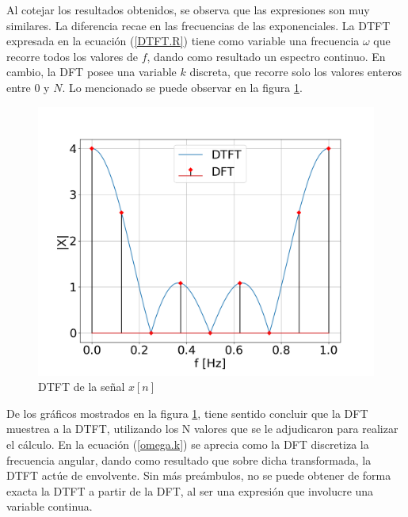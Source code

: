\documentclass[11pt,a4paper]{article}
\begin{document}
    Al cotejar los resultados obtenidos, se observa que las expresiones son muy similares. La diferencia recae en las frecuencias de las exponenciales. La DTFT expresada en la ecuación (\ref{DTFT.R}) tiene como variable una frecuencia $\omega$ que recorre todos los valores de $f$, dando como resultado un espectro continuo. En cambio, la DFT posee una variable $k$ discreta, que recorre solo los valores enteros entre 0 y $N$. Lo mencionado se puede observar en la figura \ref{fig.3a}.
    
    
    \begin{figure}[htb]
    \centering
	\includegraphics[width=.5\textwidth]{Img/punto_3_a.png}
	\caption{DTFT de la señal $x[n]$}
	\label{fig.3a}
    \end{figure}
    
    De los gráficos mostrados en la figura \ref{fig.3a}, tiene sentido concluir que la DFT muestrea a la DTFT, utilizando los N valores que se le adjudicaron para realizar el cálculo. En la ecuación (\ref{omega.k}) se aprecia como la DFT discretiza la frecuencia angular, dando como resultado que sobre dicha transformada, la DTFT actúe de envolvente. Sin más preámbulos, no se puede obtener de forma exacta la DTFT a partir de la DFT, al ser una expresión que involucre una variable continua.
    
\end{document}
